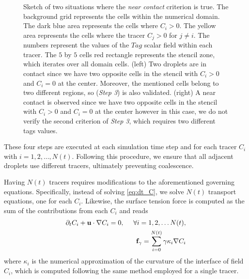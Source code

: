 \begin{figure}
    \caption{Sketch of two situations where the \textit{near contact} criterion is true. 
    The background grid represents the cells within the numerical domain. 
    The dark blue area represents the cells where $C_i > 0$.
    The yellow area represents the cells where the tracer $C_j > 0$ for $j\neq i$. 
    The numbers represent the values of the $Tag$ scalar field within each tracer.
    The $5$ by $5$ cells red rectangle represents the stencil zone, which iterates over all domain cells.  
    (left) Two droplets are in contact since we have two opposite cells in the stencil with $C_i > 0$ and $C_i=0$ at the center.
    Moreover, the mentioned cells belong to two different regions, so (\textit{Step 3}) is also validated.  
    (right) A near contact is observed since we have two opposite cells in the stencil with $C_i > 0$ and $C_i=0$ at the center however in this case, we do not verify the second criterion of \textit{Step 3}, which requires two different tags values. 
    }
    \label{fig:criterion}
\end{figure}
These four steps are executed at each simulation time step and for each tracer $C_i$ with $i = 1, 2, \ldots, N(t)$.
Following this procedure, we ensure that all adjacent droplets use different tracers, ultimately preventing coalescence. 

Having $N(t)$ tracers requires modifications to the aforementioned governing equations. 
Specifically, instead of solving \ref{eq:dt_C}, we solve $N(t)$ transport equations, one for each $C_i$.
Likewise, the surface tension force is computed as the sum of the contributions from each $C_i$ and reads
\begin{align*}
    \partial_t C_i + \textbf{u}\cdot\mathbf{\nabla} C_i = 0,
    \ \  \ \ \forall i = 1,2,\ldots N(t),\\
    \textbf{f}_\gamma 
    = \sum_{i=0}^{N(t)} \gamma \kappa_i \mathbf{\nabla} C_i
\end{align*}
where $\kappa_i$ is the numerical approximation of the curvature of the interface of field $C_i$, which is computed following the same method employed for a single tracer. 

